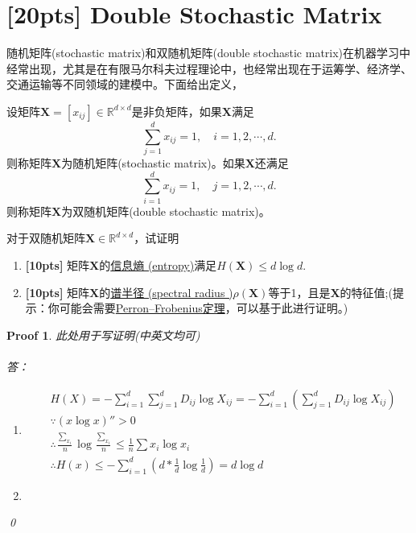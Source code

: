\documentclass[a4paper,UTF8]{article}
\numberwithin{equation}{section}
\newtheorem*{myProof}{Proof}
\begin{document}
\section{[20pts] Double Stochastic Matrix}
随机矩阵(stochastic matrix)和双随机矩阵(double stochastic matrix)在机器学习中经常出现，尤其是在有限马尔科夫过程理论中，也经常出现在于运筹学、经济学、交通运输等不同领域的建模中。下面给出定义，
\begin{def-box}[随机矩阵]
设矩阵$\mathbf{X}=[x_{ij}]\in \mathbb{R}^{d\times d}$是非负矩阵，如果$\mathbf{X}$满足
\begin{equation}
	\label{eq-sto-matrix}
	\sum_{j=1}^d x_{ij} = 1,\quad i=1,2,\cdots,d.
\end{equation}
则称矩阵$\mathbf{X}$为随机矩阵(stochastic matrix)。如果$\mathbf{X}$还满足
\begin{equation}
	\label{eq-double-sto-matrix}
	\sum_{i=1}^d x_{ij} = 1,\quad j=1,2,\cdots,d.
\end{equation}
则称矩阵$\mathbf{X}$为双随机矩阵(double stochastic matrix)。
\end{def-box}
对于双随机矩阵$\mathbf{X} \in \mathbb{R}^{d\times d}$，试证明
\begin{enumerate}[ {(}1{)}]
\item \textbf{[10pts]} 矩阵$\mathbf{X}$的\href{https://en.wikipedia.org/wiki/Entropy_(information_theory)}{信息熵 (entropy)}满足$H(\mathbf{X}) \leq d\log d$.
\item \textbf{[10pts]} 矩阵$\mathbf{X}$的\href{https://en.wikipedia.org/wiki/Spectral_radius}{谱半径 (spectral radius
)}$\rho(\mathbf{X})$等于1，且是$\mathbf{X}$的特征值;(提示：你可能会需要\href{https://en.wikipedia.org/wiki/Perron%E2%80%93Frobenius_theorem}{Perron–Frobenius定理}，可以基于此进行证明。)
\end{enumerate}
\begin{myProof}
此处用于写证明(中英文均可)
~\\
~\\
答：\\
\begin{enumerate}[ {(}1{)}]
\item
	\begin{equation}
	\begin{aligned}
		&H(X)	= -\sum_{i=1}^{d}\sum_{j=1}^{d}{D_{ij}\log{X_{ij}}}
				= -\sum_{i=1}^{d}(\sum_{j=1}^{d}{D_{ij}\log{X_{ij}}})\\
		&\because (x\log{x})'' > 0\\
		&\therefore {\frac{\sum_{x_i}}{n}}\log{{\frac{\sum_{x_i}}{n}}} 
					\leq \frac{1}{n}\sum{x_i\log{x_i}}\\
		&\therefore H(x) \leq -\sum_{i=1}^{d}
		{(d*\frac{1}{d}\log{\frac{1}{d}})}=d\log{d}
	\end{aligned}
	\end{equation}
\item

\end{enumerate}

\qed
\end{myProof}
\newpage
\end{document}
